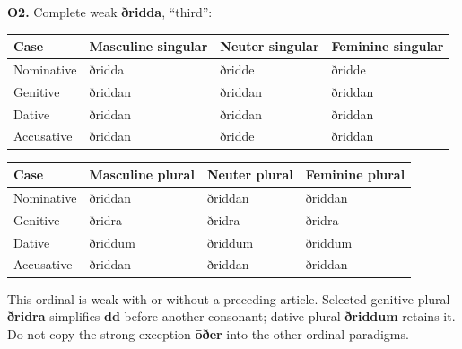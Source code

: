 \par\begin{minipage}{\linewidth}\raggedright
\textbf{O2.} Complete weak \textbf{ðridda}, “third”:

\par\begingroup
\fontsize{10.5}{13.2}\selectfont
\setlength{\LTleft}{0pt}\setlength{\LTright}{\fill}
\noindent
\begin{tabular}{@{}>{\raggedright\arraybackslash}p{22.0mm}>{\raggedright\arraybackslash}p{31.188mm}>{\raggedright\arraybackslash}p{31.188mm}>{\raggedright\arraybackslash}p{31.188mm}@{}}
\toprule
\textbf{Case} & \textbf{Masculine singular} & \textbf{Neuter singular} & \textbf{Feminine singular} \\
\midrule
Nominative & ðridda & ðridde & ðridde \\
Genitive & ðriddan & ðriddan & ðriddan \\
Dative & ðriddan & ðriddan & ðriddan \\
Accusative & ðriddan & ðridde & ðriddan \\
\bottomrule
\end{tabular}
\par\endgroup
\par\addvspace{5pt}
\par\begingroup
\fontsize{10.5}{13.2}\selectfont
\setlength{\LTleft}{0pt}\setlength{\LTright}{\fill}
\noindent
\begin{tabular}{@{}>{\raggedright\arraybackslash}p{22.0mm}>{\raggedright\arraybackslash}p{31.188mm}>{\raggedright\arraybackslash}p{31.188mm}>{\raggedright\arraybackslash}p{31.188mm}@{}}
\toprule
\textbf{Case} & \textbf{Masculine plural} & \textbf{Neuter plural} & \textbf{Feminine plural} \\
\midrule
Nominative & ðriddan & ðriddan & ðriddan \\
Genitive & ðridra & ðridra & ðridra \\
Dative & ðriddum & ðriddum & ðriddum \\
Accusative & ðriddan & ðriddan & ðriddan \\
\bottomrule
\end{tabular}
\par\endgroup
This ordinal is weak with or without a preceding article. Selected genitive plural \textbf{ðridra} simplifies \textbf{dd} before another consonant; dative plural \textbf{ðriddum} retains it. Do not copy the strong exception \textbf{ōðer} into the other ordinal paradigms.

\end{minipage}\par\addvspace{4pt}

